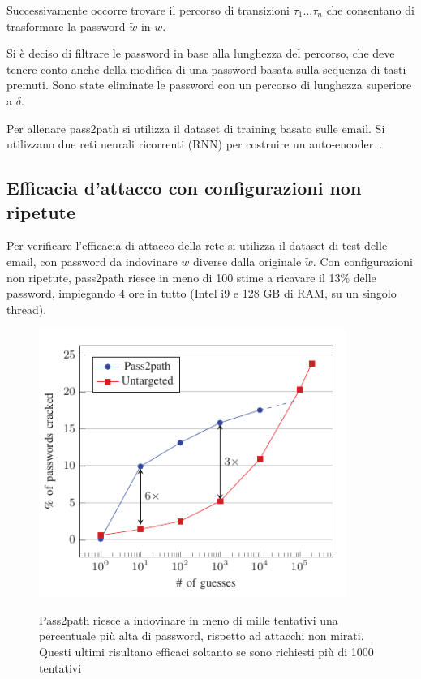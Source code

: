 Successivamente occorre trovare il percorso di transizioni  $\tau_1...\tau_n$ che consentano di trasformare la password $\tilde{w}$ in $w$.

Si è deciso di filtrare le password in base alla lunghezza del percorso, che deve tenere conto anche della modifica di una password basata sulla sequenza di tasti premuti. Sono state eliminate le password con un percorso di lunghezza superiore a $\delta$.

Per allenare pass2path si utilizza il dataset di training basato sulle email.
Si utilizzano due reti neurali ricorrenti (RNN) per costruire un auto-encoder~\cite{Sherstinsky_2020}.

\subsection{Efficacia d'attacco con configurazioni non ripetute}
\label{sec:attacco conf non ripetute}
Per verificare l'efficacia di attacco della rete si utilizza il dataset di test delle email, con password da indovinare $w$ diverse dalla originale $\tilde{w}$.
Con configurazioni non ripetute, pass2path riesce in meno di 100 stime a ricavare
il 13\% delle password, impiegando 4 ore in tutto (Intel i9 e 128 GB di RAM, su un singolo thread).
\begin{figure}[h]
    \centering
    \includegraphics[width=10cm]{./immagini/pass2path.png}
    \label{pass2path}
    \caption{Pass2path riesce a indovinare in meno di mille tentativi una percentuale più alta di password, rispetto ad attacchi non mirati. Questi ultimi risultano efficaci soltanto se sono richiesti più di 1000 tentativi~\cite{bijeeta}}
\end{figure}

